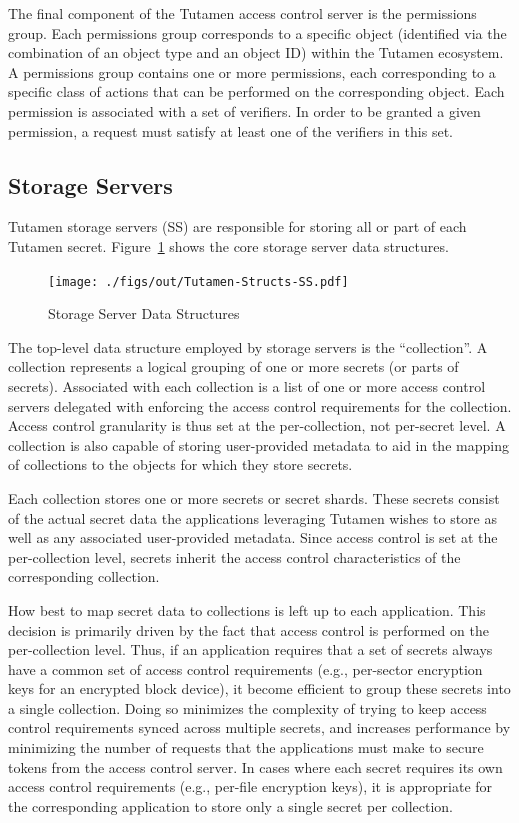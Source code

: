 The final component of the Tutamen access control server is the
permissions group. Each permissions group corresponds to a specific
object (identified via the combination of an object type and an object
ID) within the Tutamen ecosystem. A permissions group contains one or
more permissions, each corresponding to a specific class of actions
that can be performed on the corresponding object. Each permission is
associated with a set of verifiers. In order to be granted a given
permission, a request must satisfy at least one of the verifiers in
this set.

\subsection{Storage Servers}
\label{chap:tutamen:arch:ss}

Tutamen storage servers (SS) are responsible for storing all or part
of each Tutamen secret. Figure~\ref{fig:tutamen:storagestructs} shows
the core storage server data structures.

\begin{figure}[t]
  \centering
  \texttt{[image: ./figs/out/Tutamen-Structs-SS.pdf]}
  \caption{Storage Server Data Structures}
  \label{fig:tutamen:storagestructs}
\end{figure}

The top-level data structure employed by storage servers is the
``collection''. A collection represents a logical grouping of one or
more secrets (or parts of secrets). Associated with each collection is
a list of one or more access control servers delegated with enforcing
the access control requirements for the collection. Access control
granularity is thus set at the per-collection, not per-secret level. A
collection is also capable of storing user-provided metadata to aid in
the mapping of collections to the objects for which they store
secrets.

Each collection stores one or more secrets or secret shards. These
secrets consist of the actual secret data the applications leveraging
Tutamen wishes to store as well as any associated user-provided
metadata. Since access control is set at the per-collection level,
secrets inherit the access control characteristics of the
corresponding collection.

How best to map secret data to collections is left up to each
application. This decision is primarily driven by the fact that access
control is performed on the per-collection level. Thus, if an
application requires that a set of secrets always have a common set of
access control requirements (e.g., per-sector encryption keys for an
encrypted block device), it become efficient to group these secrets
into a single collection. Doing so minimizes the complexity of trying
to keep access control requirements synced across multiple secrets,
and increases performance by minimizing the number of requests that
the applications must make to secure tokens from the access control
server. In cases where each secret requires its own access control
requirements (e.g., per-file encryption keys), it is appropriate for
the corresponding application to store only a single secret per
collection.

